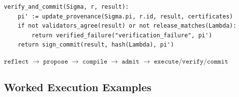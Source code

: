\documentclass[11pt]{article}
\theoremstyle{remark}
\begin{document}
\begin{lstlisting}[basicstyle=\ttfamily\small,frame=single,breaklines=true,columns=fullflexible,caption={Verification, provenance, and commit}]
verify_and_commit(Sigma, r, result):
    pi' := update_provenance(Sigma.pi, r.id, result, certificates)
    if not validators_agree(result) or not release_matches(Lambda):
        return verified_failure("verification_failure", pi')
    return sign_commit(result, hash(Lambda), pi')
\end{lstlisting}

\begin{center}
\small
\(\texttt{reflect} \;\longrightarrow\; \texttt{propose} \;\longrightarrow\; \texttt{compile} \;\longrightarrow\; \texttt{admit} \;\longrightarrow\; \texttt{execute/verify/commit}\)
\end{center}

\subsection{Worked Execution Examples}
\end{document}
